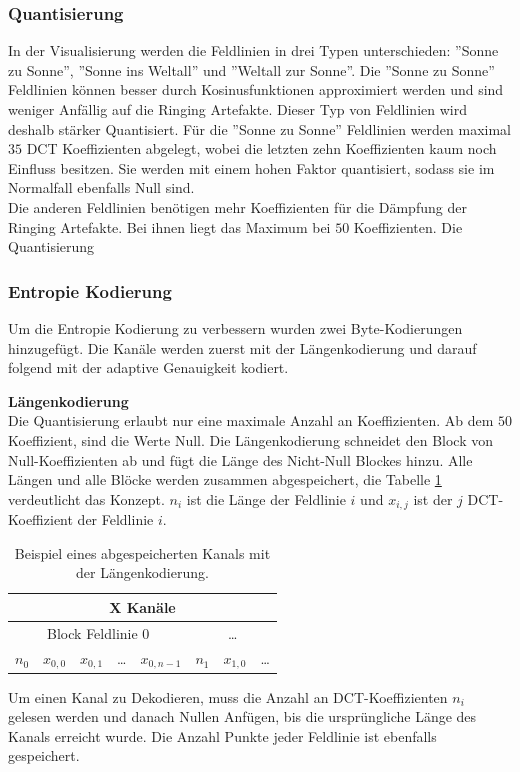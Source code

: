 \subsubsection{Quantisierung}
In der Visualisierung werden die Feldlinien in drei Typen unterschieden: ''Sonne zu Sonne'', ''Sonne ins Weltall'' und ''Weltall zur Sonne''.  Die ''Sonne zu Sonne'' Feldlinien können besser durch Kosinusfunktionen approximiert werden und sind weniger Anfällig auf die Ringing Artefakte. Dieser Typ von Feldlinien wird deshalb stärker Quantisiert. Für die ''Sonne zu Sonne'' Feldlinien werden maximal $35$ DCT Koeffizienten abgelegt, wobei die letzten zehn Koeffizienten kaum noch Einfluss besitzen. Sie werden mit einem hohen Faktor quantisiert, sodass sie im Normalfall ebenfalls Null sind.\\
Die anderen Feldlinien benötigen mehr Koeffizienten für die Dämpfung der Ringing Artefakte. Bei ihnen liegt das Maximum bei $50$ Koeffizienten. Die Quantisierung 

\subsubsection{Entropie Kodierung}\label{konzept:loesung1:kodierung}
Um die Entropie Kodierung zu verbessern wurden zwei Byte-Kodierungen hinzugefügt. Die Kanäle werden zuerst mit der Längenkodierung und darauf folgend mit der adaptive Genauigkeit kodiert.

\textbf{Längenkodierung}\\
Die Quantisierung erlaubt nur eine maximale Anzahl an Koeffizienten. Ab dem $50$ Koeffizient, sind die Werte Null. Die Längenkodierung schneidet den Block von Null-Koeffizienten ab und fügt die Länge des Nicht-Null Blockes hinzu. Alle Längen und alle Blöcke werden zusammen abgespeichert, die Tabelle \ref{konzept:loesung1:entropie:laengenkodierung} verdeutlicht das Konzept. $n_i$ ist die Länge der Feldlinie $i$ und $x_{i,j}$ ist der $j$ DCT-Koeffizient der Feldlinie $i$.\\
\begin{table}[!htbp]
	\center
	\begin{tabular}{||c|c|c|c|c||c|c|c}
		\hline
		\multicolumn{8}{|c|}{X Kanäle}\\\hline\hline
		 \multicolumn{5}{||c||}{Block Feldlinie 0} & \multicolumn{3}{c}{\ldots} \\\hline
		$n_0$ &$x_{0,0}$ &$x_{0,1}$ & \ldots & $x_{0,n-1}$ & $n_1$ & $x_{1,0}$ & \ldots\\\hline
	\end{tabular}
	\caption{Beispiel eines abgespeicherten Kanals mit der Längenkodierung.}
	\label{konzept:loesung1:entropie:laengenkodierung}
\end{table}
Um einen Kanal zu Dekodieren, muss die Anzahl an DCT-Koeffizienten $n_i$ gelesen werden und danach Nullen Anfügen, bis die ursprüngliche Länge des Kanals erreicht wurde. Die Anzahl Punkte jeder Feldlinie ist ebenfalls gespeichert.

